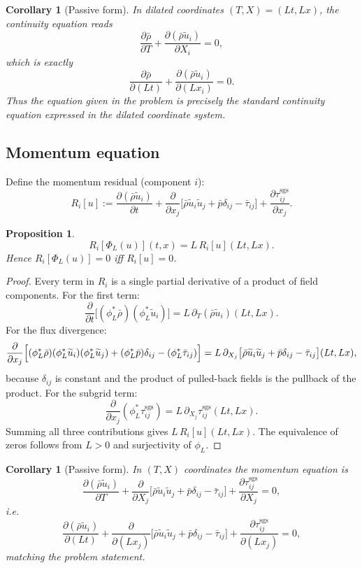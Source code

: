 \documentclass[11pt]{article}
\newtheorem{proposition}[theorem]{Proposition}
\newtheorem{corollary}[theorem]{Corollary}
\theoremstyle{definition}
\theoremstyle{remark}
\newcommand{\sgs}{\mathrm{sgs}}
\newcommand{\barrho}{\bar{\rho}}
\newcommand{\barp}{\bar{p}}
\newcommand{\bartau}{\bar{\tau}}
\newcommand{\tilu}{\widetilde{u}}
\begin{document}
\begin{corollary}[Passive form]
In dilated coordinates $(T,X)=(Lt,Lx)$, the continuity equation reads
\[
\frac{\partial\barrho}{\partial T}
+\frac{\partial(\barrho\tilu_i)}{\partial X_i}=0,
\]
which is exactly
\[
\frac{\partial\barrho}{\partial(Lt)}
+\frac{\partial(\barrho\tilu_i)}{\partial(Lx_i)}=0.
\]
Thus the equation given in the problem is precisely the standard continuity
equation expressed in the dilated coordinate system.
\end{corollary}

\subsection{Momentum equation}

Define the momentum residual (component $i$):
\[
R_i[u]:=\frac{\partial(\barrho\tilu_i)}{\partial t}
+\frac{\partial}{\partial x_j}\bigl[\barrho\tilu_i\tilu_j+\barp\delta_{ij}
-\bartau_{ij}\bigr]
+\frac{\partial\tau^{\sgs}_{ij}}{\partial x_j}.
\]

\begin{proposition}
\label{prop:momentum}
\[
R_i[\Phi_L(u)](t,x)=L\,R_i[u](Lt,Lx).
\]
Hence $R_i[\Phi_L(u)]=0$ iff $R_i[u]=0$.
\end{proposition}

\begin{proof}
Every term in $R_i$ is a single partial derivative of a product of field
components.  For the first term:
\[
\frac{\partial}{\partial t}\bigl[(\phi_L^*\barrho)(\phi_L^*\tilu_i)\bigr]
=L\,\partial_T(\barrho\tilu_i)(Lt,Lx).
\]
For the flux divergence:
\[
\frac{\partial}{\partial x_j}\Bigl[
(\phi_L^*\barrho)(\phi_L^*\tilu_i)(\phi_L^*\tilu_j)
+(\phi_L^*\barp)\delta_{ij}
-(\phi_L^*\bartau_{ij})
\Bigr]
=L\,\partial_{X_j}\bigl[\barrho\tilu_i\tilu_j+\barp\delta_{ij}
-\bartau_{ij}\bigr](Lt,Lx),
\]
because $\delta_{ij}$ is constant and the product of pulled-back fields is
the pullback of the product.  For the subgrid term:
\[
\frac{\partial}{\partial x_j}(\phi_L^*\tau^{\sgs}_{ij})
=L\,\partial_{X_j}\tau^{\sgs}_{ij}(Lt,Lx).
\]
Summing all three contributions gives $L\,R_i[u](Lt,Lx)$.  The equivalence
of zeros follows from $L>0$ and surjectivity of $\phi_L$.
\end{proof}

\begin{corollary}[Passive form]
In $(T,X)$ coordinates the momentum equation is
\[
\frac{\partial(\barrho\tilu_i)}{\partial T}
+\frac{\partial}{\partial X_j}\bigl[\barrho\tilu_i\tilu_j+\barp\delta_{ij}
-\bartau_{ij}\bigr]
+\frac{\partial\tau^{\sgs}_{ij}}{\partial X_j}=0,
\]
i.e.
\[
\frac{\partial(\barrho\tilu_i)}{\partial(Lt)}
+\frac{\partial}{\partial(Lx_j)}\bigl[\barrho\tilu_i\tilu_j+\barp\delta_{ij}
-\bartau_{ij}\bigr]
+\frac{\partial\tau^{\sgs}_{ij}}{\partial(Lx_j)}=0,
\]
matching the problem statement.
\end{corollary}
\end{document}
